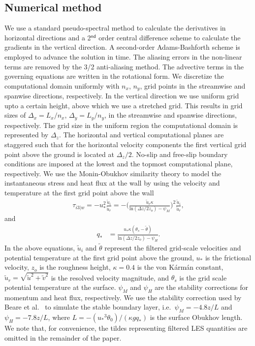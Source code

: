 \documentclass[%
 aip,
 amsmath,amssymb,
preprint,%
author-numerical,%
]{revtex4-1}
\begin{document}
\subsection{Numerical method}\label{sec2.2} 
We use a standard pseudo-spectral method to calculate the derivatives in horizontal directions and a 2$^\mathsf{nd}$ order central difference scheme to calculate the gradients in the vertical direction. A second-order Adams-Bashforth scheme is employed to advance the solution in time. The aliasing errors in the non-linear terms are removed by the 3/2 anti-aliasing method\cite{can88}. The advective terms in the governing equations are written in the rotational form\cite{fer02}. We discretize the computational domain uniformly with $n_x$, $n_y$, grid points in the streamwise and spanwise directions, respectively. In the vertical direction we use uniform grid upto a certain height, above which we use a stretched grid. This results in grid sizes of $\Delta_{x}=L_x/n_x$, $\Delta_{y}=L_y/n_y$, in the streamwise and spanwise directions, respectively. The grid size in the uniform region the computational domain is represented by $\Delta_z$. The horizontal and vertical computational planes are staggered such that for the horizontal velocity components the first vertical grid point above the ground is located at $\Delta_{z}/2$. No-slip and free-slip boundary conditions are imposed at the lowest and the topmost computational plane, respectively. We use the Monin-Obukhov similarity theory \cite{moe84} to model the instantaneous stress and heat flux at the wall by using the velocity and temperature at the first grid point above the wall
%
\begin{align}
\tau_{i3|w}=-{u_{*}^2}\frac{\widetilde{u}_i}{\widetilde{u}_r}=-\Bigg(\frac{\widetilde{u}_r\kappa}{\text{ln}(\Delta{z}/2z_o)-\psi_{M}}\Bigg)^2\frac{\widetilde{u}_i}{\widetilde{u}_r},\label{eqn6}
\end{align}
%
and
%
\begin{align} 
q_{*}&=\frac{u_{*}\kappa(\theta_s-\widetilde{\theta})}{\text{ln}(\Delta{z}/2z_o)-\psi_{H}}.\label{eqn7}
\end{align}
%
\noindent In the above equations, $\widetilde{u}_i$ and $\widetilde{\theta}$ represent the filtered grid-scale velocities and potential temperature at the first grid point above the ground, $u_*$ is the frictional velocity, $z_o$ is the roughness height, $\kappa=0.4$ is the von K\'arm\'an constant, $\widetilde{u}_r=\sqrt{\widetilde{u}^2 + \widetilde{v}^2}$ is the resolved velocity magnitude, and $\theta_s$ is the grid scale potential temperature at the surface. $\psi_M$ and $\psi_H$ are the stability corrections for momentum and heat flux, respectively. We use the stability correction used by Beare et al.\ \cite{bea06} to simulate the stable boundary layer, i.e.\ $\psi_{M}= -4.8z/L$ and $\psi_{H}= -7.8z/L$, where $L=-({u_*}^3\theta_{0})/({\kappa}gq_{*})$ is the surface Obukhov length. We note that, for convenience, the tildes representing filtered LES quantities are omitted in the remainder of the paper.
\end{document}

